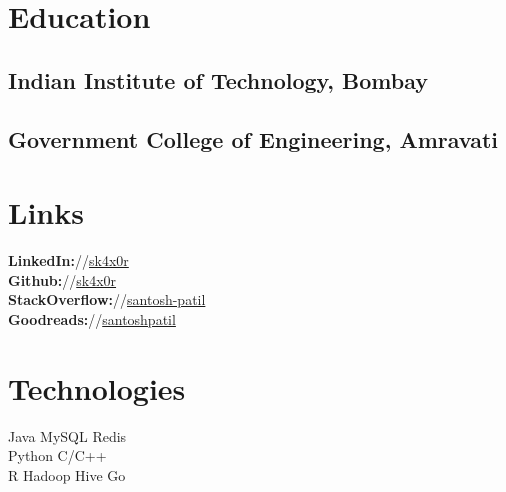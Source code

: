 \documentclass[12pt, a4paper]{deedy-resume}
\begin{document}
\begin{minipage}[t]{0.29\textwidth} %

\section{Education}

\subsection{Indian Institute of Technology, Bombay}


\sectionspace %

\subsection{Government College of Engineering, Amravati}

\sectionspace %


\section{Links}
\textbf{LinkedIn:}//\href{https://www.linkedin.com/in/sk4x0r}{sk4x0r} \\
\textbf{Github:}//\href{https://github.com/sk4x0r}{sk4x0r} \\
\textbf{StackOverflow:}//\href{http://stackoverflow.com/users/717417}{santosh-patil} \\
\textbf{Goodreads:}//\href{http://goodreads.com/santoshpatil}{santoshpatil}

\sectionspace


\section{Technologies}
Java \textbullet{} MySQL \textbullet{} Redis
\\
Python \textbullet{} C/C++ 
\\
R \textbullet{} Hadoop \textbullet{} Hive \textbullet{} Go
\sectionspace

\end{minipage}
\end{document}
